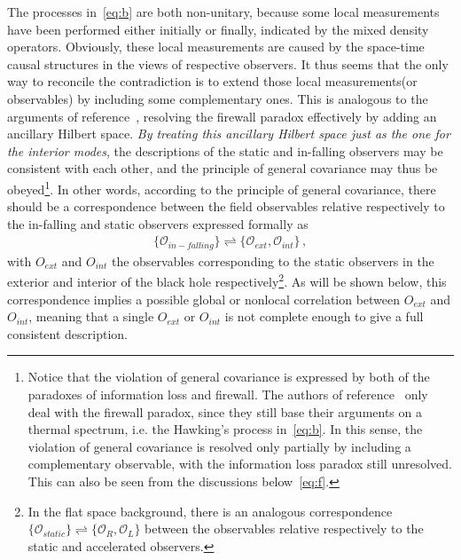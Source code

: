 \documentclass[12pt,a4paper]{article}
\begin{document}
The processes in~\eqref{eq:b} are both non-unitary, because some local measurements have been performed either initially or finally, indicated by the mixed density operators. Obviously, these local measurements are caused by the space-time causal structures in the views of respective observers. It thus seems that the only way to reconcile the contradiction is to extend those local measurements(or observables) by including some complementary ones. This is analogous to the arguments of reference~\cite{h}, resolving the firewall paradox effectively by adding an ancillary Hilbert space. \emph{By treating this ancillary Hilbert space just as the one for the interior modes}, the descriptions of the static and in-falling observers may be consistent with each other, and the principle of general covariance may thus be obeyed\footnote{Notice that the violation of general covariance is expressed by both of the paradoxes of information loss and firewall. The authors of reference~\cite{h} only deal with the firewall paradox, since they still base their arguments on a thermal spectrum, i.e. the Hawking's process in~\eqref{eq:b}. In this sense, the violation of general covariance is resolved only partially by including a complementary observable, with the information loss paradox still unresolved. This can also be seen from the discussions below~\eqref{eq:f}.}. In other words, according to the principle of general covariance, there should be a correspondence between the field observables relative respectively to the in-falling and static observers expressed formally as
\begin{equation}
\label{eq:c}
\begin{split}
\{\mathcal{O}_{in-falling}\}\rightleftharpoons \{\mathcal{O}_{ext},\mathcal{O}_{int}\}\,,
\end{split}
\end{equation}
with $O_{ext}$ and $O_{int}$ the observables corresponding to the static observers in the exterior and interior of the black hole respectively\footnote{In the flat space background, there is an analogous correspondence $\{\mathcal{O}_{static}\}\rightleftharpoons \{\mathcal{O}_{R},\mathcal{O}_{L}\}$ between the observables relative respectively to the static and accelerated observers.}. As will be shown below, this correspondence implies a possible global or nonlocal correlation between $O_{ext}$ and $O_{int}$, meaning that a single $O_{ext}$ or $O_{int}$ is not complete enough to give a full consistent description.
\end{document}

